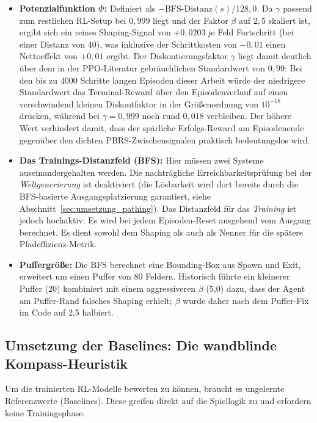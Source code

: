 \documentclass[
  a4paper,
  11pt,
  twoside,
  BCOR=8mm,           %
  headings=big,
  numbers=noenddot,
  listof=totoc,       %
  captions=tableheading,
]{scrreprt}
\begin{document}
\begin{itemize}
    \item \textbf{Potenzialfunktion $\Phi$:} Definiert als $-\text{BFS-Distanz}(s) / 128{,}0$. Da $\gamma$ passend zum restlichen RL-Setup bei $0{,}999$ liegt und der Faktor $\beta$ auf $2{,}5$ skaliert ist, ergibt sich ein reines Shaping-Signal von $+0{,}0203$ je Feld Fortschritt (bei einer Distanz von 40), was inklusive der Schrittkosten von $-0{,}01$ einen Nettoeffekt von $+0{,}01$ ergibt. Der Diskontierungsfaktor $\gamma$ liegt damit deutlich über dem in der PPO-Literatur gebräuchlichen Standardwert von $0{,}99$: Bei den bis zu 4000 Schritte langen Episoden dieser Arbeit würde der niedrigere Standardwert das Terminal-Reward über den Episodenverlauf auf einen verschwindend kleinen Diskontfaktor in der Größenordnung von $10^{-18}$ drücken, während bei $\gamma = 0{,}999$ noch rund $0{,}018$ verbleiben. Der höhere Wert verhindert damit, dass der spärliche Erfolgs-Reward am Episodenende gegenüber den dichten PBRS-Zwischensignalen praktisch bedeutungslos wird.
    \item \textbf{Das Trainings-Distanzfeld (BFS):} Hier müssen zwei Systeme auseinandergehalten werden. Die nachträgliche Erreichbarkeitsprüfung bei der \textit{Weltgenerierung} ist deaktiviert (die Lösbarkeit wird dort bereits durch die BFS-basierte Ausgangsplatzierung garantiert, siehe Abschnitt~\ref{sec:umsetzung_pathing}). Das Distanzfeld für das \textit{Training} ist jedoch hochaktiv: Es wird bei jedem Episoden-Reset ausgehend vom Ausgang berechnet. Es dient sowohl dem Shaping als auch als Nenner für die spätere Pfadeffizienz-Metrik.
    \item \textbf{Puffergröße:} Die BFS berechnet eine Bounding-Box aus Spawn und Exit, erweitert um einen Puffer von 80 Feldern. Historisch führte ein kleinerer Puffer (20) kombiniert mit einem aggressiveren $\beta$ (5,0) dazu, dass der Agent am Puffer-Rand falsches Shaping erhielt; $\beta$ wurde daher nach dem Puffer-Fix im Code auf 2,5 halbiert.
\end{itemize}

\subsection{Umsetzung der Baselines: Die wandblinde Kompass-Heuristik}
\label{sec:impl_rl_baselines}
Um die trainierten RL-Modelle bewerten zu können, braucht es ungelernte Referenzwerte (Baselines). Diese greifen direkt auf die Spiellogik zu und erfordern keine Trainingsphase. 
\end{document}
